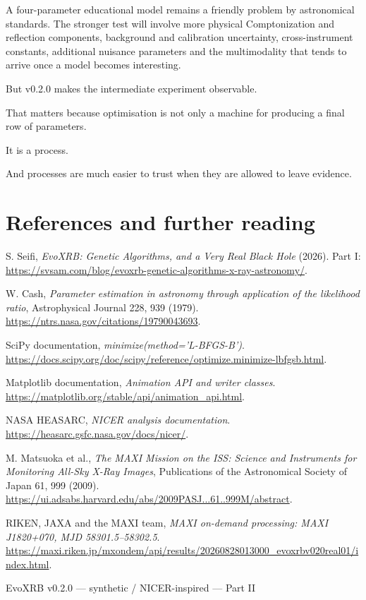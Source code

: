 \documentclass[11pt]{article}
\begin{document}
A four-parameter educational model remains a friendly problem by astronomical
standards. The stronger test will involve more physical Comptonization and
reflection components, background and calibration uncertainty, cross-instrument
constants, additional nuisance parameters and the multimodality that tends to
arrive once a model becomes interesting.

But v0.2.0 makes the intermediate experiment observable.

That matters because optimisation is not only a machine for producing a final
row of parameters.

It is a process.

And processes are much easier to trust when they are allowed to leave evidence.

\section{References and further reading}

\begin{enumerate}[label={[\arabic*]}]
  \item S. Seifi, \textit{EvoXRB: Genetic Algorithms, and a Very Real Black
  Hole} (2026). Part I:
  \url{https://svsam.com/blog/evoxrb-genetic-algorithms-x-ray-astronomy/}.

  \item W. Cash, \textit{Parameter estimation in astronomy through application
  of the likelihood ratio}, Astrophysical Journal 228, 939 (1979).
  \url{https://ntrs.nasa.gov/citations/19790043693}.

  \item SciPy documentation, \textit{minimize(method='L-BFGS-B')}.
  \url{https://docs.scipy.org/doc/scipy/reference/optimize.minimize-lbfgsb.html}.

  \item Matplotlib documentation, \textit{Animation API and writer classes}.
  \url{https://matplotlib.org/stable/api/animation_api.html}.

  \item NASA HEASARC, \textit{NICER analysis documentation}.
  \url{https://heasarc.gsfc.nasa.gov/docs/nicer/}.

  \item M. Matsuoka et al., \textit{The MAXI Mission on the ISS: Science and
  Instruments for Monitoring All-Sky X-Ray Images}, Publications of the
  Astronomical Society of Japan 61, 999 (2009).
  \url{https://ui.adsabs.harvard.edu/abs/2009PASJ...61..999M/abstract}.

  \item RIKEN, JAXA and the MAXI team, \textit{MAXI on-demand processing:
  MAXI J1820+070, MJD 58301.5--58302.5}.
  \url{https://maxi.riken.jp/mxondem/api/results/20260828013000_evoxrbv020real01/index.html}.
\end{enumerate}

\vfill
\begin{center}
\small\textcolor{EvoMuted}{
EvoXRB v0.2.0 --- synthetic / NICER-inspired --- Part II
}
\end{center}
\end{document}
